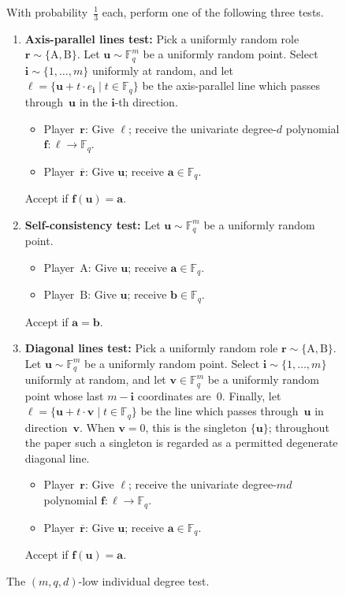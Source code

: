 \documentclass[11pt]{article}
\theoremstyle{definition}
\newcommand{\F}{\mathbb F}
\newcommand{\ba}{\boldsymbol{a}}
\newcommand{\bb}{\boldsymbol{b}}
\newcommand{\boldf}{\boldsymbol{f}}
\newcommand{\bi}{\boldsymbol{i}}
\newcommand{\bell}{\boldsymbol{\ell}}
\newcommand{\br}{\boldsymbol{r}}
\newcommand{\bu}{\boldsymbol{u}}
\newcommand{\bv}{\boldsymbol{v}}
\begin{document}
{
\begin{figure}
With probability~$\tfrac{1}{3}$ each, perform one of the following three tests.
\begin{enumerate}
	\item \textbf{Axis-parallel lines test:}
		Pick a uniformly random role $\br \sim \{\mathrm{A},\mathrm{B}\}$.
		Let $\bu \sim \F_q^m$ be a uniformly random point.
		Select $\bi \sim \{1, \ldots, m\}$ uniformly at random,
		and let $\bell = \{\bu + t \cdot e_{\bi} \mid t \in \F_q\}$
		be the axis-parallel line which passes through~$\bu$ in the $\bi$-th direction.
		\begin{itemize}
		\item[$\circ$] Player~$\br$:
			Give $\bell$;
			receive the univariate degree-$d$ polynomial $\boldf:\bell \rightarrow \F_q$.
		\item[$\circ$] Player~$\overline{\br}$:
			Give $\bu$;
			receive $\ba \in \F_q$.
		\end{itemize}
		Accept if $\boldf(\bu) = \ba$.
	\item \textbf{Self-consistency test:}
		Let $\bu \sim \F_q^m$ be a uniformly random point.
		\begin{itemize}
		\item[$\circ$] Player~$\mathrm{A}$:
			Give $\bu$;
			receive $\ba \in \F_q$.
		\item[$\circ$] Player~$\mathrm{B}$:
			Give $\bu$;
			receive $\bb \in \F_q$.
		\end{itemize}
		Accept if $\ba = \bb$.
	\item \textbf{Diagonal lines test:}
		Pick a uniformly random role $\br \sim \{\mathrm{A},\mathrm{B}\}$.
		Let $\bu \sim \F_q^m$ be a uniformly random point.
		Select $\bi \sim \{1, \ldots, m\}$ uniformly at random,
		and let $\bv \in \F_q^m$ be a uniformly random point whose last $m - \bi$ coordinates are~$0$.
		Finally,
		let $\bell = \{\bu + t \cdot \bv \mid t \in \F_q\}$
		be the line which passes through~$\bu$ in direction~$\bv$.
		When $\bv=0$, this is the singleton $\{\bu\}$; throughout the
		paper such a singleton is regarded as a permitted degenerate
		diagonal line.
		\begin{itemize}
		\item[$\circ$] Player~$\br$:
			Give $\bell$;
			receive the univariate degree-$md$ polynomial $\boldf:\bell \rightarrow \F_q$.
		\item[$\circ$] Player~$\overline{\br}$:
			Give $\bu$;
			receive $\ba \in \F_q$.
		\end{itemize}
		Accept if $\boldf(\bu) = \ba$.
	\end{enumerate}
	\caption{The $(m,q,d)$-low individual degree test.\label{fig:test}}
\end{figure}
}
\end{document}
